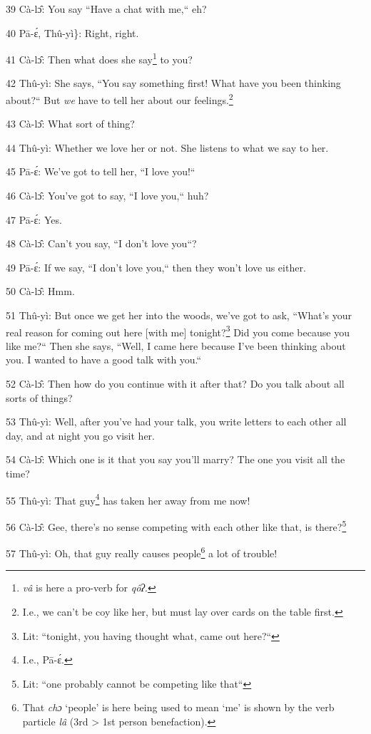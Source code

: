 39 Cà-lɔ̂: You say ``Have a chat with me,`` eh?

40 Pā-ɛ́, Thû-yì\}: Right, right.

41 Cà-lɔ̂: Then what does she say\footnote{\textit{vâ }is here a pro-verb for \textit{qôʔ}.} to you?

42 Thû-yì: She says, ``You say something first! What have you been thinking
about?`` But \textit{we} have to tell her about our feelings.\footnote{I.e., we can't be coy like her, but must lay over cards on the table first.}

43 Cà-lɔ̂: What sort of thing?

44 Thû-yì: Whether we love her or not. She listens to what we say to her.

45 Pā-ɛ́: We've got to tell her, ``I love you!``

46 Cà-lɔ̂: You've got to say, ``I love you,`` huh?

47 Pā-ɛ́: Yes.

48 Cà-lɔ̂: Can't you say, ``I don't love you``?

49 Pā-ɛ́: If we say, ``I don't love you,`` then they won't
love us either.

50 Cà-lɔ̂: Hmm.

51 Thû-yì: But once we get her into the woods, we've got to ask, ``What's
your real reason for coming out here [with me] tonight?\footnote{Lit: ``tonight, you having thought what, came out here?``} Did you come because
you like me?`` Then she says, ``Well, I came here because I've
been thinking about you. I wanted to have a good talk with you.``

52 Cà-lɔ̂: Then how do you continue with it after that? Do you talk about all
sorts of things?

53 Thû-yì: Well, after you've had your talk, you write letters to each other
all day, and at night you go visit her.

54 Cà-lɔ̂: Which one is it that you say you'll marry? The one you visit all
the time?

55 Thû-yì: That guy\footnote{I.e., Pā-ɛ́.} has taken her away from me now!

56 Cà-lɔ̂: Gee, there's no sense competing with each other like that, is there?\footnote{Lit: ``one probably cannot be competing like that``}

57 Thû-yì: Oh, that guy really causes people\footnote{That \textit{chɔ} `people' is here being used to mean `me' is shown by the verb particle \textit{lâ} (3rd > 1st person benefaction).} a lot of trouble!

